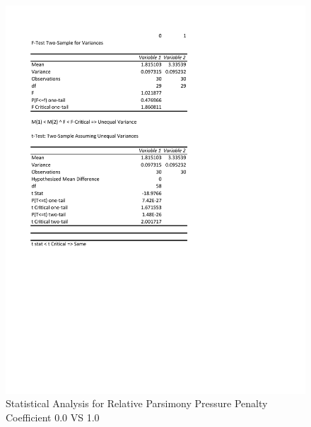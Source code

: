 \documentclass[times]{article}
\begin{document}
	\begin{figure}
		\caption{Statistical Analysis for Relative Parsimony Pressure Penalty Coefficient 0.0 VS 1.0}
		\label{fig:stat_rel_02}
		\includegraphics[width=\textwidth]{./pictures/relative_02.pdf}
	\end{figure}
\end{document}
